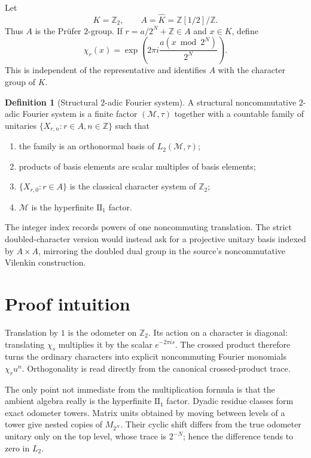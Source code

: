 \documentclass[11pt]{article}
\theoremstyle{definition}
\newtheorem{definition}[theorem]{Definition}
\theoremstyle{remark}
\newcommand{\Z}{\mathbb Z}
\newcommand{\M}{\mathcal M}
\newcommand{\1}{\mathbf 1}
\begin{document}
Let
\[
 K=\Z_2,\qquad A=\widehat K=\Z[1/2]/\Z.
\]
Thus $A$ is the Pr\"ufer $2$-group.  If
$r=a/2^N+\Z\in A$ and $x\in K$, define
\[
 \chi_r(x)=\exp\!\left(2\pi i\frac{a(x\bmod 2^N)}{2^N}\right).
\]
This is independent of the representative and identifies $A$ with the
character group of $K$.

\begin{definition}[Structural $2$-adic Fourier system]
A structural noncommutative $2$-adic Fourier system is a finite factor
$(\M,\tau)$ together with a countable family of unitaries
$\{X_{r,n}:r\in A,n\in\Z\}$ such that
\begin{enumerate}[label=(\roman*)]
\item the family is an orthonormal basis of $L_2(\M,\tau)$;
\item products of basis elements are scalar multiples of basis elements;
\item $\{X_{r,0}:r\in A\}$ is the classical character system of $\Z_2$;
\item $\M$ is the hyperfinite $\mathrm{II}_1$ factor.
\end{enumerate}
\end{definition}

The integer index records powers of one noncommuting translation.  The strict
doubled-character version would instead ask for a projective unitary basis
indexed by $A\times A$, mirroring the doubled dual group in the source's
noncommutative Vilenkin construction.

\section{Proof intuition}

Translation by $1$ is the odometer on $\Z_2$.  Its action on a character is
diagonal: translating $\chi_s$ multiplies it by the scalar
$e^{-2\pi i s}$.  The crossed product therefore turns the ordinary characters
into explicit noncommuting Fourier monomials $\chi_r u^n$.  Orthogonality is
read directly from the canonical crossed-product trace.

The only point not immediate from the multiplication formula is that the
ambient algebra really is the hyperfinite $\mathrm{II}_1$ factor.  Dyadic
residue classes form exact odometer towers.  Matrix units obtained by moving
between levels of a tower give nested copies of $M_{2^N}$.  Their cyclic shift
differs from the true odometer unitary only on the top level, whose trace is
$2^{-N}$; hence the difference tends to zero in $L_2$.
\end{document}
